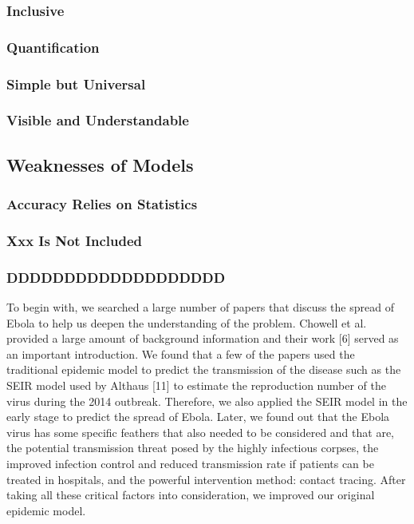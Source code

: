 \documentclass{mcmthesis}
\begin{document}
\subsubsection{Inclusive}
\subsubsection{Quantification}
\subsubsection{Simple but Universal}
\subsubsection{Visible and Understandable}
\subsection{Weaknesses of Models}
\subsubsection{Accuracy Relies on Statistics}
\subsubsection{Xxx Is Not Included}
\subsubsection{DDDDDDDDDDDDDDDDDDD}
To begin with, we searched a large number of papers that discuss the spread of
Ebola to help us deepen the understanding of the problem. Chowell et al. provided a
large amount of background information and their work [6] served as an important
introduction. We found that a few of the papers used the traditional epidemic model to
predict the transmission of the disease such as the SEIR model used by Althaus [11] to
estimate the reproduction number of the virus\cite{bib1,bib2} during the 2014 outbreak. Therefore, we
also applied the SEIR model in the early stage to predict the spread of Ebola. Later, we
found out that the Ebola virus has some specific feathers that also needed to be
considered and that are, the potential transmission threat posed by the highly infectious
corpses, the improved infection control and reduced transmission rate if patients can be
treated in hospitals, and the powerful intervention method: contact tracing. After taking
all these critical factors into consideration, we improved our original epidemic model.
\end{document}
